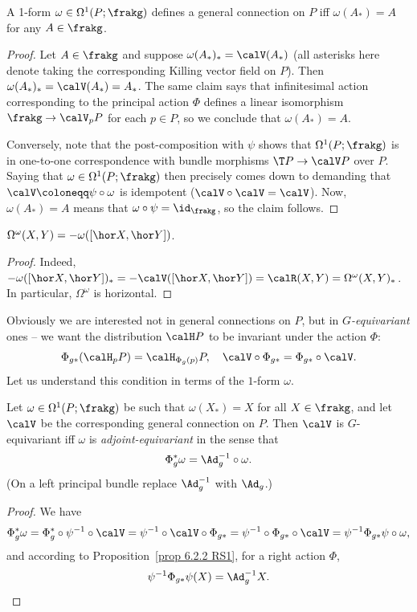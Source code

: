 \begin{prop}
    A 1-form $\omega\in\Omega^1(P;\frakg)$ defines a general connection on $P$ iff $\omega(A_\ast)=A$ for any $A\in\frakg$.
\end{prop}
\begin{proof}
    Let $A\in\frakg$ and suppose $\omega(A_\ast)_\ast=\calV(A_\ast)$ (all asterisks here denote taking the corresponding Killing vector field on $P$).  Then $\omega(A_\ast)_\ast=\calV(A_\ast)=A_\ast$. The same claim says that infinitesimal action corresponding to the principal action $\Phi$ defines a linear isomorphism $\frakg\to \calV_pP$ for each $p\in P$, so we conclude that $\omega(A_\ast)=A$. 

    Conversely, note that the post-composition with $\psi$ shows that $\Omega^1(P;\frakg)$ is in one-to-one correspondence with bundle morphisms $\T P\to \calV P$ over $P$. Saying that $\omega\in\Omega^1(P;\frakg)$ then precisely comes down to demanding that $\calV\coloneqq \psi\circ\omega$ is idempotent ($\calV\circ\calV=\calV$). Now, $\omega(A_\ast)=A$ means that $\omega\circ\psi=\id_\frakg$, so the claim follows.
\end{proof}
\begin{cor}\label{cor curvature 2-form}
    $\Omega^\omega(X,Y)=-\omega([\hor X,\hor Y])$.
\end{cor}
\begin{proof}
    Indeed, $-\omega([\hor X,\hor Y])_\ast=-\calV([\hor X,\hor Y])=\calR(X,Y)=\Omega^\omega(X,Y)_\ast$. In particular, $\Omega^\omega$ is horizontal.
\end{proof}

Obviously we are interested not in general connections on $P$, but in \emph{$G$-equivariant} ones -- we want the distribution $\calH P$ to be invariant under the action $\Phi$:
\[\Phi_{g\ast}(\calH_pP)=\calH_{\Phi_g(p)}P,\quad \calV\circ \Phi_{g\ast}=\Phi_{g\ast}\circ \calV.\]
Let us understand this condition in terms of the $1$-form $\omega$.

\begin{prop}
    Let $\omega\in\Omega^1(P;\frakg)$ be such that $\omega(X_\ast)=X$ for all $X\in\frakg$, and let $\calV$ be the corresponding general connection on $P$. Then $\calV$ is $G$-equivariant iff $\omega$ is \emph{adjoint-equivariant} in the sense that 
    \[\Phi_g^\ast\omega=\Ad_{g}^{-1}\circ\omega.\]
    (On a left principal bundle replace $\Ad_g^{-1}$ with $\Ad_g$.)
\end{prop}
\begin{proof}
    We have
    \[\Phi^\ast_g\omega=\Phi^\ast_g\circ\psi^{-1}\circ \calV=\psi^{-1}\circ\calV\circ \Phi_{g\ast}=\psi^{-1}\circ\Phi_{g\ast}\circ\calV=\psi^{-1}\Phi_{g\ast}\psi\circ\omega,\]
    and according to Proposition~\ref{prop 6.2.2 RS1}, for a right action $\Phi$,
    \[\psi^{-1}\Phi_{g\ast}\psi(X)=\Ad_g^{-1}X.\]
\end{proof}


